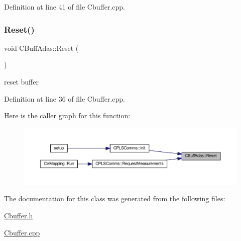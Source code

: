 Definition at line 41 of file Cbuffer.\+cpp.

\mbox{\label{class_c_buff_adas_a2ff1ee5f1dfa56117d76b17027d7b7e8}} 
\subsubsection{\texorpdfstring{Reset()}{Reset()}}
{\footnotesize\ttfamily void C\+Buff\+Adas\+::\+Reset (\begin{DoxyParamCaption}{ }\end{DoxyParamCaption})}



reset buffer 



Definition at line 36 of file Cbuffer.\+cpp.

Here is the caller graph for this function\+:\nopagebreak
\begin{figure}[H]
\begin{center}
\leavevmode
\includegraphics[width=350pt]{class_c_buff_adas_a2ff1ee5f1dfa56117d76b17027d7b7e8_icgraph}
\end{center}
\end{figure}


The documentation for this class was generated from the following files\+:\begin{DoxyCompactItemize}
\item 
\mbox{\hyperlink{_cbuffer_8h}{Cbuffer.\+h}}\item 
\mbox{\hyperlink{_cbuffer_8cpp}{Cbuffer.\+cpp}}\end{DoxyCompactItemize}
